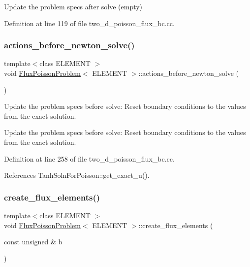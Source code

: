 Update the problem specs after solve (empty) 



Definition at line 119 of file two\+\_\+d\+\_\+poisson\+\_\+flux\+\_\+bc.\+cc.

\mbox{\label{classFluxPoissonProblem_aaea8f7f6f7a2e1aedfd2854e1ae12338}} 
\subsubsection{\texorpdfstring{actions\+\_\+before\+\_\+newton\+\_\+solve()}{actions\_before\_newton\_solve()}}
{\footnotesize\ttfamily template$<$class E\+L\+E\+M\+E\+NT $>$ \\
void \hyperlink{classFluxPoissonProblem}{Flux\+Poisson\+Problem}$<$ E\+L\+E\+M\+E\+NT $>$\+::actions\+\_\+before\+\_\+newton\+\_\+solve (\begin{DoxyParamCaption}{ }\end{DoxyParamCaption})\hspace{0.3cm}{\ttfamily [private]}}



Update the problem specs before solve\+: Reset boundary conditions to the values from the exact solution. 

Update the problem specs before solve\+: Reset boundary conditions to the values from the exact solution. 

Definition at line 258 of file two\+\_\+d\+\_\+poisson\+\_\+flux\+\_\+bc.\+cc.



References Tanh\+Soln\+For\+Poisson\+::get\+\_\+exact\+\_\+u().

\mbox{\label{classFluxPoissonProblem_a542ce9cc1c4e17eae68d51d2e13ac0c3}} 
\subsubsection{\texorpdfstring{create\+\_\+flux\+\_\+elements()}{create\_flux\_elements()}}
{\footnotesize\ttfamily template$<$class E\+L\+E\+M\+E\+NT $>$ \\
void \hyperlink{classFluxPoissonProblem}{Flux\+Poisson\+Problem}$<$ E\+L\+E\+M\+E\+NT $>$\+::create\+\_\+flux\+\_\+elements (\begin{DoxyParamCaption}\item[{const unsigned \&}]{b }\end{DoxyParamCaption})\hspace{0.3cm}{\ttfamily [private]}}



